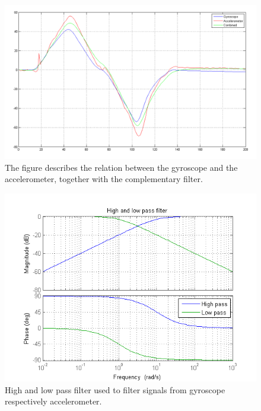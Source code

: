 \documentclass[a4paper]{article}
\begin{document}
\begin{figure}[H]
 \centering
\includegraphics[scale=0.4]{pic/GyroAccCombAng.png}
\caption{The figure describes the relation between the gyroscope and the accelerometer, together with the complementary filter.}
\end{figure}

\begin{figure}[H]
  \centering
\includegraphics[scale=0.8]{pic/HP_LP.png}
\caption{High and low pass filter used to filter signals from gyroscope respectively accelerometer.}
\end{figure}

\end{document}
